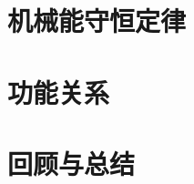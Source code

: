 \documentclass[color=purple,openany]{textbook-cn}
\begin{document}
\begin{Link}
\zhlipsum[1]
\end{Link}



\section{机械能守恒定律}

\begin{Point}
\lipsum[2]
\end{Point}

\begin{Case}
\item \lipsum[1][3]
\item \lipsum[1][3]
\item \lipsum[1][3]
\item \lipsum[1][3]
\end{Case}

\begin{Link}
\zhlipsum[1]
\end{Link}





\section{功能关系}

\begin{Point}
\lipsum[2]
\end{Point}

\begin{Case}
\item \lipsum[1][3]
\item \lipsum[1][3]
\item \lipsum[1][3]
\item \lipsum[1][3]
\end{Case}

\begin{Link}
\zhlipsum[1]
\end{Link}




\section{回顾与总结}
\begin{Point}
\lipsum[2]
\end{Point}

\begin{Case*}
\item \lipsum[1][3]
\item \lipsum[1][3]
\item \lipsum[1][3]
\item \lipsum[1][3]
\end{Case*}
\end{document}
